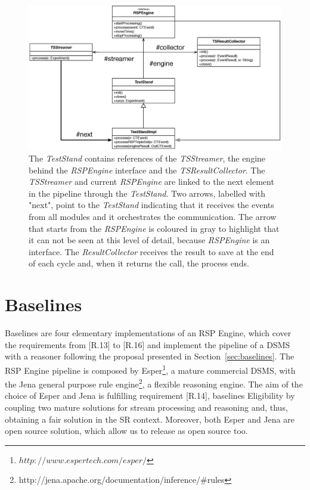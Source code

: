 \begin{figure}[p!]
  \centering
	\includegraphics[width=1\linewidth]{images/uml_teststand_modules}
	\caption[\name \textsc{TestStand} and Modules  - UML Schema] {The \textit{TestStand} contains references of the \textit{TSStreamer}, the engine behind the \textit{RSPEngine} interface and the \textit{TSResultCollector}. The \textit{TSStreamer} and current \textit{RSPEngine} are linked to the next element in the pipeline through the \textit{TestStand}. Two arrows, labelled with "next", point to the  \textit{TestStand} indicating that it receives the events from all modules and it orchestrates the communication. The arrow that starts from the \textit{RSPEngine} is coloured in gray to highlight that it can not be seen at this level of detail, because \textit{RSPEngine} is an interface. The \textit{ResultCollector} receives the result to save at the end of each cycle and, when it returns the call, the process ends.} 
  	\label{fig:uml_teststand_modules}
\end{figure}

\pagebreak

\section{Baselines}\label{sec:baselines-impl}

\name Baselines are four elementary implementations of an RSP Engine, which  cover the requirements from [R.13] to [R.16] and implement the pipeline of a DSMS with a reasoner following the proposal presented in Section~\ref{sec:baselines}. 
The RSP Engine pipeline is composed by Esper\footnote{$http://www.espertech.com/esper/$}, a mature commercial DSMS, with the Jena general purpose rule engine\footnote{http://jena.apache.org/documentation/inference/\#rules}, a flexible reasoning engine.  The aim of the choice of Esper and Jena is fulfilling requirement [R.14], baselines Eligibility by coupling two mature solutions for stream processing and reasoning and, thus, obtaining a fair solution in the SR context. Moreover, both Esper and Jena are open source solution, which allow us to release \name as open source too.

